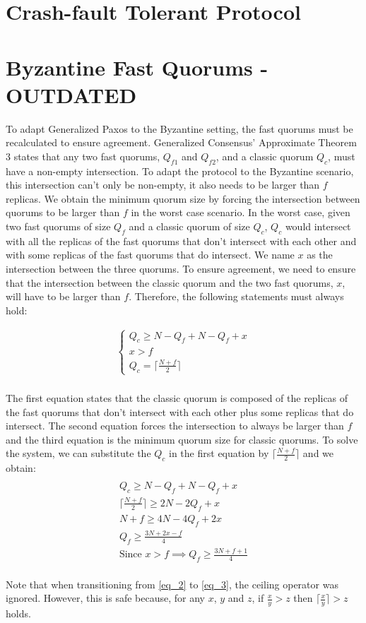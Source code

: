 \section{Crash-fault Tolerant Protocol}



\clearpage
\section{Byzantine Fast Quorums - OUTDATED}
To adapt Generalized Paxos to the Byzantine setting, the fast quorums must be recalculated to ensure agreement. Generalized Consensus' Approximate Theorem 3 states that any two fast quorums, $Q_{f1}$ and $Q_{f2}$, and a classic quorum $Q_c$, must have a non-empty intersection. To adapt the protocol to the Byzantine scenario, this intersection can't only be non-empty, it also needs to be larger than $f$ replicas. We obtain the minimum quorum size by forcing the intersection between quorums to be larger than $f$ in the worst case scenario. In the worst case, given two fast quorums of size $Q_f$ and a classic quorum of size $Q_c$, $Q_c$ would intersect with all the replicas of the fast quorums that don't intersect with each other and with some replicas of the fast quorums that do intersect. We name $x$ as the intersection between the three quorums. To ensure agreement, we need to ensure that the intersection between the classic quorum and the two fast quorums, $x$, will have to be larger than $f$. Therefore, the following statements must always hold:

\begin{gather*}
\begin{cases}
Q_c \geq N - Q_f + N-Q_f + x \\
x > f \\
Q_c = \lceil \frac{N+f}{2}\rceil
\end{cases} \\ 
\end{gather*}

The first equation states that the classic quorum is composed of the replicas of the fast quorums that don't intersect with each other plus some replicas that do intersect. The second equation forces the intersection to always be larger than $f$ and the third equation is the minimum quorum size for classic quorums. To solve the system, we can substitute the $Q_c$ in the first equation by $\lceil \frac{N+f}{2}\rceil$ and we obtain:
\begin{gather*} \\
Q_c \geq N - Q_f + N-Q_f + x \label{eq_1} \tag{1} \\ 
\lceil\frac{N+f}{2}\rceil \geq 2N - 2Q_f + x \label{eq_2} \tag{2} \\
N+f \geq 4N - 4Q_f + 2x \label{eq_3} \tag{3} \\
Q_f \geq \frac{3N+2x-f}{4} \label{eq_4} \tag{4} \\ 
\text{Since $x > f$} \implies Q_f \geq \frac{3N+f+1}{4} \label{eq_5} \tag{5}  \\
\end{gather*}

Note that when transitioning from \eqref{eq_2} to \eqref{eq_3}, the ceiling operator was ignored. However, this is safe because, for any $x$, $y$ and $z$, if $\frac{x}{y} > z$ then $\lceil \frac{x}{y} \rceil > z$ holds.\par

